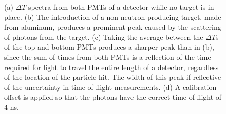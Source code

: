 \begin{figure}[htbp]

\caption{
(a) $\Delta T$ spectra from both PMTs of a detector while no target is in place.
(b) The introduction of a non-neutron producing target, made from aluminum, produces a prominent peak caused by the scattering of photons from the target.
(c) Taking the average between the $\Delta T$s of the top and bottom PMTs produces a sharper peak than in (b), since the sum of times from both PMTs is a reflection of the time required for light to travel the entire length of a detector, regardless of the location of the particle hit.
The width of this peak if reflective of the uncertainty in time of flight measurements. 
(d) A calibration offset is applied so that the photons have the correct time of flight of 4 ns.}
\label{fig:ToFDetermination}
\end{figure}
   
